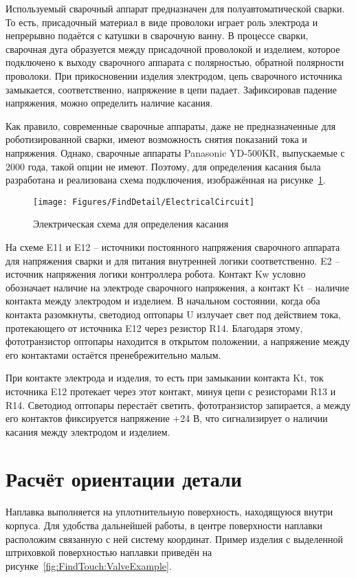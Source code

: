 Используемый сварочный аппарат предназначен для полуавтоматической сварки.
То есть, присадочный материал в виде проволоки играет роль электрода и непрерывно подаётся с катушки в сварочную ванну.
В процессе сварки, сварочная дуга образуется между присадочной проволокой и изделием, которое подключено к выходу сварочного аппарата с полярностью, обратной полярности проволоки.
При прикосновении изделия электродом, цепь сварочного источника замыкается, соответственно, напряжение в цепи падает.
Зафиксировав падение напряжения, можно определить наличие касания.

Как правило, современные сварочные аппараты, даже не предназначенные для роботизированной сварки, имеют возможность снятия показаний тока и напряжения.
Однако, сварочные аппараты Panasonic YD-500KR, выпускаемые с 2000 года, такой опции не имеют.
Поэтому, для определения касания была разработана и реализована схема подключения, изображённая на рисунке~\ref{fig:FindTouch:ElectricalCircuit}.

\begin{figure}[H]
    \centering
    \vspace{14pt}
    \texttt{[image: Figures/FindDetail/ElectricalCircuit]}
    \caption{Электрическая схема для определения касания}
    \label{fig:FindTouch:ElectricalCircuit}
\end{figure}

На схеме E11 и E12 -- источники постоянного напряжения сварочного аппарата для напряжения сварки и для питания внутренней логики соответственно.
E2 -- источник напряжения логики контроллера робота.
Контакт Kw условно обозначает наличие на электроде сварочного напряжения, а контакт Kt -- наличие контакта между электродом и изделием.
В начальном состоянии, когда оба контакта разомкнуты, светодиод оптопары U излучает свет под действием тока, протекающего от источника E12 через резистор R14.
Благодаря этому, фототранзистор оптопары находится в открытом положении, а напряжение между его контактами остаётся пренебрежительно малым.

При контакте электрода и изделия, то есть при замыкании контакта Kt, ток источника E12 протекает через этот контакт, минуя цепи с резисторами R13 и R14.
Светодиод оптопары перестаёт светить, фототранзистор запирается, а между его контактов фиксируется напряжение +24 В, что сигнализирует о наличии касания между электродом и изделием.


\section{Расчёт ориентации детали}
Наплавка выполняется на уплотнительную поверхность, находящуюся внутри корпуса.
Для удобства дальнейшей работы, в центре поверхности наплавки расположим связанную с ней систему координат.
Пример изделия с выделенной штриховкой поверхностью наплавки приведён на рисунке~\ref{fig:FindTouch:ValveExample}.

